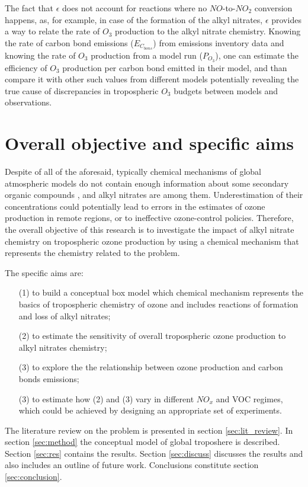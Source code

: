 \documentclass[11pt,a4paper]{article}
\begin{document}
The fact that $\epsilon$ does not account for reactions where no $NO$-to-$NO_2$ conversion happens, as, for example, in case of the formation of the alkyl nitrates, $\epsilon$ provides a way to relate the rate of $O_3$ production to the alkyl nitrate chemistry. Knowing the rate of carbon bond emissions ($E_{C_{bons}}$) from emissions inventory data and knowing the rate of $O_3$ production from a model run ($P_{O_3}$), one can estimate the efficiency of $O_3$ production per carbon bond emitted in their model, and than compare it with other such values from different models potentially revealing the true cause of discrepancies in tropospheric $O_3$ budgets between models and observations.

\section{Overall objective and specific aims} \label{sec:objams}
Despite of all of the aforesaid, typically chemical mechanisms of global atmospheric models do not contain enough information about some secondary organic compounds \citep{Sommariva2008}, and alkyl nitrates are among them. Underestimation of their concentrations could potentially lead to errors in the estimates of ozone production in remote regions, or to ineffective ozone-control policies. Therefore, the overall objective of this research is to investigate the impact of alkyl nitrate chemistry on tropospheric ozone production by using a chemical mechanism that represents the chemistry related to the problem.

The specific aims are:
\begin{itemize}
\item[(1)] to build a conceptual box model which chemical mechanism represents the basics of tropospheric chemistry of ozone and includes reactions of formation and loss of alkyl nitrates;
\item[(2)] to estimate the sensitivity of overall tropospheric ozone production to alkyl nitrates chemistry;
\item[(3)] to explore the the relationship between ozone production and carbon bonds emissions;
\item[(3)] to estimate how (2) and (3) vary in different $NO_x$ and VOC regimes, which could be achieved by designing an appropriate set of experiments.
\end{itemize}

The literature review on the problem is presented in section \ref{sec:lit_review}. In section \ref{sec:method} the conceptual model of global troposhere is described. Section \ref{sec:res} contains the results. Section \ref{sec:discuss} discusses the results and also includes an outline of future work. Conclusions constitute section \ref{sec:conclusion}.
\end{document}

